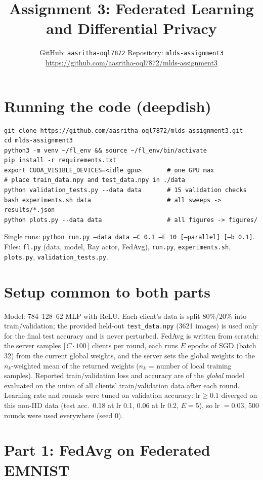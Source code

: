 \documentclass[11pt]{article}
\title{Assignment 3: Federated Learning and Differential Privacy}
\author{GitHub: \texttt{aasritha-oql7872} \quad Repository: \texttt{mlds-assignment3}\\
\url{https://github.com/aasritha-oql7872/mlds-assignment3}}
\date{}
\begin{document}
\maketitle

\section*{Running the code (deepdish)}
\begin{verbatim}
git clone https://github.com/aasritha-oql7872/mlds-assignment3.git
cd mlds-assignment3
python3 -m venv ~/fl_env && source ~/fl_env/bin/activate
pip install -r requirements.txt
export CUDA_VISIBLE_DEVICES=<idle gpu>       # one GPU max
# place train_data.npy and test_data.npy in ./data
python validation_tests.py --data data       # 15 validation checks
bash experiments.sh data                     # all sweeps -> results/*.json
python plots.py --data data                  # all figures -> figures/
\end{verbatim}
Single runs: \texttt{python run.py --data data --C 0.1 --E 10 [--parallel] [--b 0.1]}.
Files: \texttt{fl.py} (data, model, Ray actor, FedAvg), \texttt{run.py}, \texttt{experiments.sh}, \texttt{plots.py}, \texttt{validation\_tests.py}.\sloppy

\section*{Setup common to both parts}
Model: 784--128--62 MLP with ReLU. Each client's data is split 80\%/20\% into train/validation; the provided held-out \texttt{test\_data.npy} (3621 images) is used only for the final test accuracy and is never perturbed. FedAvg is written from scratch: the server samples $\lceil C\cdot 100\rceil$ clients per round, each runs $E$ epochs of SGD (batch 32) from the current global weights, and the server sets the global weights to the $n_k$-weighted mean of the returned weights ($n_k$ = number of local training samples). Reported train/validation loss and accuracy are of the \emph{global} model evaluated on the union of all clients' train/validation data after each round. Learning rate and rounds were tuned on validation accuracy: $\mathrm{lr}\ge 0.1$ diverged on this non-IID data (test acc.\ 0.18 at lr 0.1, 0.06 at lr 0.2, $E{=}5$), so lr $=0.03$, 500 rounds were used everywhere (seed 0).

\section{Part 1: FedAvg on Federated EMNIST}
\end{document}
